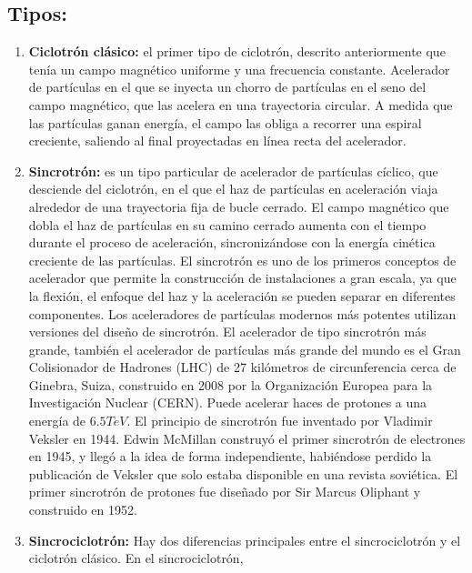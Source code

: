 \documentclass[12pt]{article}
\begin{document}
			\subsection{Tipos:}\label{subsec:Tipos:}
				\begin{enumerate}
					\item \textbf{Ciclotrón clásico:}
					el primer tipo de ciclotrón, descrito anteriormente que tenía un campo magnético uniforme y una 
					frecuencia constante. Acelerador de partículas en el que se inyecta un chorro de partículas en el 
					seno del campo magnético, que las acelera en una trayectoria circular. A medida que las partículas 
					ganan energía, el campo las obliga a recorrer una espiral creciente, saliendo al final proyectadas 
					en línea recta del acelerador. \\
					\item \textbf{Sincrotrón:}
					es un tipo particular de acelerador de partículas cíclico, que desciende del ciclotrón, en el que el 
					haz de partículas en aceleración viaja alrededor de una trayectoria fija de bucle cerrado. El campo 
					magnético que dobla el haz de partículas en su camino cerrado aumenta con el tiempo durante el 
					proceso de aceleración, sincronizándose con la energía cinética creciente de las partículas. El 
					sincrotrón es uno de los primeros conceptos de acelerador que permite la construcción de 
					instalaciones a gran escala, ya que la flexión, el enfoque del haz y la aceleración se pueden separar 
					en diferentes componentes. Los aceleradores de partículas modernos más potentes utilizan versiones del 
					diseño de sincrotrón. El acelerador de tipo sincrotrón más grande, también el acelerador de partículas 
					más grande del mundo es el Gran Colisionador de Hadrones (LHC) de 27 kilómetros de circunferencia cerca 
					de Ginebra, Suiza, construido en 2008 por la Organización Europea para la Investigación Nuclear (CERN). 
					Puede acelerar haces de protones a una energía de $ 6.5 TeV $. El principio de sincrotrón fue inventado 
					por Vladimir Veksler en 1944. Edwin McMillan construyó el primer sincrotrón de electrones en 1945, y 
					llegó a la idea de forma independiente, habiéndose perdido la publicación de Veksler que solo estaba 
					disponible en una revista soviética. El primer sincrotrón de protones fue diseñado por Sir Marcus Oliphant 
					y construido en 1952.\\
					\item \textbf{Sincrociclotrón:}
					Hay dos diferencias principales entre el sincrociclotrón y el ciclotrón clásico. En el sincrociclotrón, 

\end{enumerate}
\end{document}

